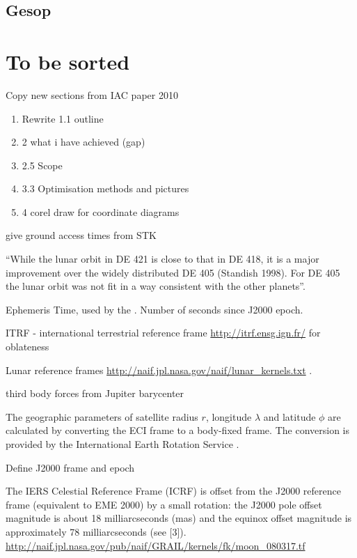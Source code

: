 \subsection{Gesop}

\section{To be sorted}

Copy new sections from IAC paper 2010 \textcite{Shimmin2010}

\begin{enumerate}
\item Rewrite 1.1 outline
\item 2 what i have achieved (gap)
\item 2.5 Scope
\item 3.3 Optimisation methods and pictures
\item 4 corel draw for coordinate diagrams
\end{enumerate}

give ground access times from STK

\enquote{While the lunar orbit in DE 421 is close to that in DE 418, it is a major improvement over the widely distributed DE 405 (Standish 1998). For DE 405 the lunar orbit was not fit in a way consistent with the other planets}\cite{DE421}.

Ephemeris Time, used by the \textcite{NAIF2010}. Number of seconds since J2000 epoch.


ITRF - international terrestrial reference frame \url{http://itrf.ensg.ign.fr/} for oblateness

Lunar reference frames \url{http://naif.jpl.nasa.gov/naif/lunar_kernels.txt} \textcite{LCF}.

third body forces from Jupiter barycenter

The geographic parameters of satellite radius $r$, longitude $\lambda$ and latitude $\phi$ are calculated by converting the ECI frame to a body-fixed frame. The conversion is provided by the International Earth Rotation Service \parencite{Petit2010}.

Define J2000 frame and epoch

The IERS Celestial Reference Frame (ICRF) is offset from the J2000 reference frame (equivalent to EME 2000) by a small rotation:  the J2000 pole offset magnitude is about 18 milliarcseconds (mas) and the equinox offset magnitude is approximately 78 milliarcseconds (see [3]). \url{http://naif.jpl.nasa.gov/pub/naif/GRAIL/kernels/fk/moon_080317.tf}

